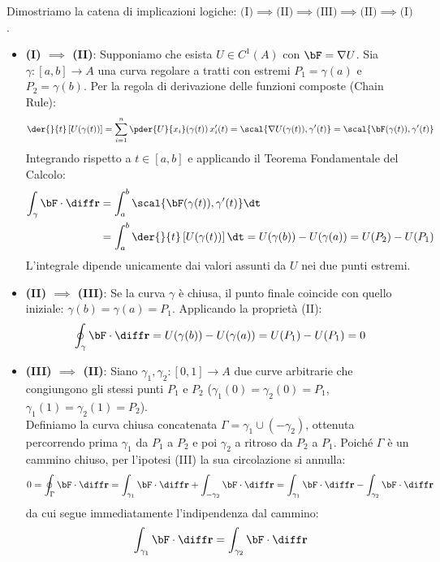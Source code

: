 \begin{dimostrazione}
Dimostriamo la catena di implicazioni logiche: $\text{(I)} \implies \text{(II)} \implies \text{(III)} \implies \text{(II)} \implies \text{(I)}$.

\begin{itemize}
    \item \textbf{(I) $\implies$ (II)}: Supponiamo che esista $U \in C^1(A)$ con $\bF = \nabla U$. Sia $\gamma: [a,b] \to A$ una curva regolare a tratti con estremi $P_1 = \gamma(a)$ e $P_2 = \gamma(b)$. Per la regola di derivazione delle funzioni composte (Chain Rule):
    \[
    \der{}{t}\left[ U(\gamma(t)) \right] = \sum_{i=1}^n \pder{U}{x_i}(\gamma(t)) \, x_i'(t) = \scal{\nabla U(\gamma(t)), \gamma'(t)} = \scal{\bF(\gamma(t)), \gamma'(t)}
    \]
    Integrando rispetto a $t \in [a,b]$ e applicando il Teorema Fondamentale del Calcolo:
    \begin{align*}
    \int_\gamma \bF \cdot \diff\mathbf{r} &= \int_{a}^{b} \scal{\bF(\gamma(t)), \gamma'(t)} \dt \\
    &= \int_{a}^{b} \der{}{t}\left[ U(\gamma(t)) \right] \dt = U(\gamma(b)) - U(\gamma(a)) = U(P_2) - U(P_1)
    \end{align*}
    L'integrale dipende unicamente dai valori assunti da $U$ nei due punti estremi.

    \item \textbf{(II) $\implies$ (III)}: Se la curva $\gamma$ è chiusa, il punto finale coincide con quello iniziale: $\gamma(b) = \gamma(a) = P_1$. Applicando la proprietà (II):
    \[
    \oint_\gamma \bF \cdot \diff\mathbf{r} = U(\gamma(b)) - U(\gamma(a)) = U(P_1) - U(P_1) = 0
    \]

    \item \textbf{(III) $\implies$ (II)}: Siano $\gamma_1, \gamma_2: [0,1] \to A$ due curve arbitrarie che congiungono gli stessi punti $P_1$ e $P_2$ ($\gamma_1(0) = \gamma_2(0) = P_1$, $\gamma_1(1) = \gamma_2(1) = P_2$).\\
    Definiamo la curva chiusa concatenata $\Gamma = \gamma_1 \cup (-\gamma_2)$, ottenuta percorrendo prima $\gamma_1$ da $P_1$ a $P_2$ e poi $\gamma_2$ a ritroso da $P_2$ a $P_1$. Poiché $\Gamma$ è un cammino chiuso, per l'ipotesi (III) la sua circolazione si annulla:
    \[
    0 = \oint_\Gamma \bF \cdot \diff\mathbf{r} = \int_{\gamma_1} \bF \cdot \diff\mathbf{r} + \int_{-\gamma_2} \bF \cdot \diff\mathbf{r} = \int_{\gamma_1} \bF \cdot \diff\mathbf{r} - \int_{\gamma_2} \bF \cdot \diff\mathbf{r}
    \]
    da cui segue immediatamente l'indipendenza dal cammino:
    \[
    \int_{\gamma_1} \bF \cdot \diff\mathbf{r} = \int_{\gamma_2} \bF \cdot \diff\mathbf{r}
    \]


\end{itemize}
\end{dimostrazione}
